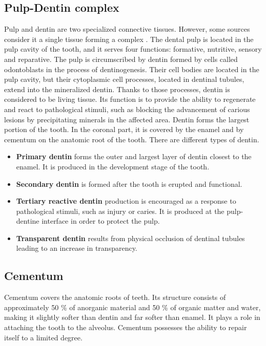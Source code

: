 \subsection*{Pulp-Dentin complex}
Pulp and dentin are two specialized connective tissues. However, some sources consider it a single tissue forming a complex \cite{2019a}.
The dental pulp is located in the pulp cavity of the tooth, and it serves four functions: formative, nutritive, sensory and reparative.
The pulp is circumscribed by dentin formed by cells called odontoblasts in the process of dentinogenesis. Their cell bodies are located in the pulp cavity, but their cytoplasmic cell processes, located in dentinal tubules, extend into the mineralized dentin. Thanks to those processes, dentin is considered to be living tissue. Its function is to provide the ability to regenerate and react to pathological stimuli, such as blocking the advancement of carious lesions by precipitating minerals in the affected area.
Dentin forms the largest portion of the tooth. In the coronal part, it is covered by the enamel and by cementum on the anatomic root of the tooth. There are different types of dentin.
\begin{itemize}
    \item \textbf{Primary dentin} forms the outer and largest layer of dentin closest to the enamel. It is produced in the development stage of the tooth.
    \item \textbf {Secondary dentin} is formed after the tooth is erupted and functional.
    \item \textbf{Tertiary reactive dentin} production is encouraged as a response to pathological stimuli, such as injury or caries. It is produced at the pulp-dentine interface in order to protect the pulp.
    \item \textbf{Transparent dentin} results from physical occlusion of dentinal tubules leading to an increase in transparency.
\end{itemize}


\subsection*{Cementum}
Cementum covers the anatomic roots of teeth. Its structure consists of approximately 50 \% of anorganic material and 50 \% of organic matter and water, making it slightly softer than dentin and far softer than enamel. It plays a role in attaching the tooth to the alveolus. Cementum possesses the ability to repair itself to a limited degree.

